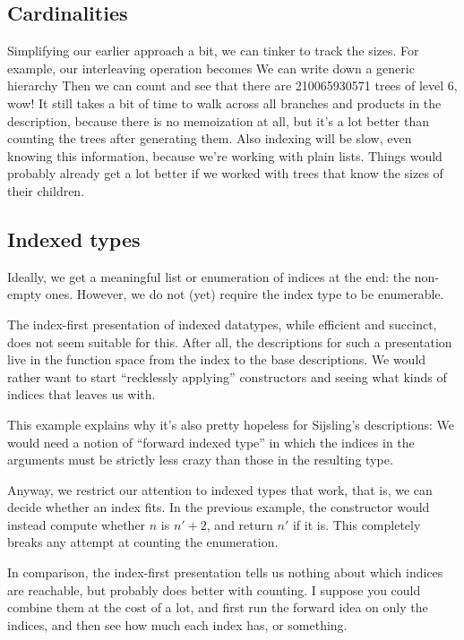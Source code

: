 \subsection{Cardinalities}
Simplifying our earlier approach a bit, we can tinker 
to track the sizes. For example, our interleaving operation becomes
We can write down a generic hierarchy
Then we can count 
and see that there are 210065930571 trees of level 6, wow! It still takes a bit of time to walk across all branches and products in the description, because there is no memoization at all, but it's a lot better than counting the trees after generating them. Also indexing will be slow, even knowing this information, because we're working with plain lists. Things would probably already get a lot better if we worked with trees that know the sizes of their children.

\subsection{Indexed types}
Ideally, we get a meaningful list or enumeration of indices at the end: the non-empty ones. However, we do not (yet) require the index type to be enumerable.

The index-first presentation of indexed datatypes, while efficient and succinct, does not seem suitable for this. After all, the descriptions for such a presentation live in the function space from the index to the base descriptions. We would rather want to start ``recklessly applying'' constructors and seeing what kinds of indices that leaves us with.

This example explains why it's also pretty hopeless for Sijsling's descriptions:
We would need a notion of ``forward indexed type'' in which the indices in the arguments must be strictly less crazy than those in the resulting type.

Anyway, we restrict our attention to indexed types that work, that is, we can decide whether an index fits. In the previous example, the constructor would instead compute whether $n$ is $n' + 2$, and return $n'$ if it is. This completely breaks any attempt at counting the enumeration.

In comparison, the index-first presentation tells us nothing about which indices are reachable, but probably does better with counting. I suppose you could combine them at the cost of a lot, and first run the forward idea on only the indices, and then see how much each index has, or something.
